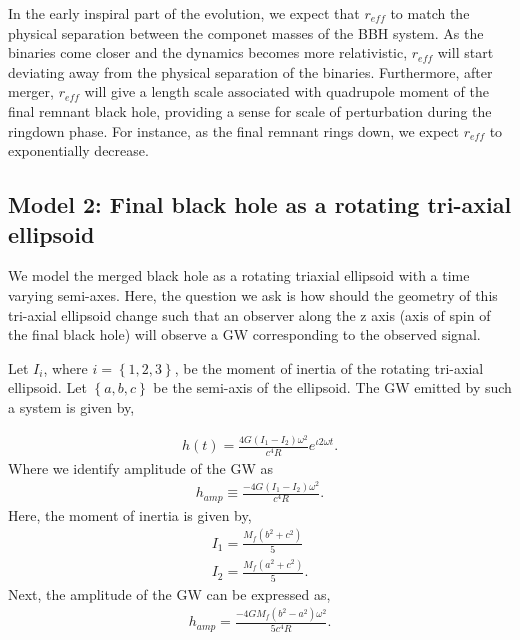In the early inspiral part of the evolution, we expect that $r_{eff}$ to match the physical separation between the componet masses of the BBH system. As the binaries come closer and the dynamics becomes more relativistic, $r_{eff}$ will start deviating away from the physical separation of the binaries. Furthermore, after merger, $r_{eff}$ will give a length scale associated with quadrupole moment of the final remnant black hole, providing a sense for scale of perturbation during the ringdown phase. For instance, as the final remnant rings down, we expect $r_{eff}$ to exponentially decrease. 

\subsection{Model 2: Final black hole as a rotating tri-axial ellipsoid} 
\label{sec:model2}
We model the merged black hole as a rotating triaxial ellipsoid with a time varying semi-axes. Here, the question we ask is how should the geometry of this tri-axial ellipsoid change such that an observer along the z axis (axis of spin of the final black hole) will observe a GW corresponding to the observed signal. 

Let $I_{i}$, where $i = \left\lbrace 1,2,3 \right\rbrace $, be the moment of inertia of the rotating tri-axial ellipsoid. Let $\left\lbrace a,b,c \right\rbrace$ be the semi-axis of the ellipsoid. The GW emitted by such a system is given by,

\begin{align}
h(t)=\frac{4 G (I_{1}-I_{2}) \omega^{2}}{c^4 R} e^{\iota 2\omega t}.
\end{align}
Where we identify amplitude of the GW as
\begin{align}
h_{amp}\equiv \frac{-4 G (I_{1}-I_{2}) \omega^{2}}{c^4 R}.
\end{align}
Here, the moment of inertia is given by, 
\begin{align}
I_{1}=\frac{M_{f} (b^{2}+c^{2})}{5}
\\I_{2}=\frac{M_{f} (a^{2}+c^{2})}{5}.
\end{align}
Next, the amplitude of the GW can be expressed as,
\begin{align}
\label{eq:hamp}
h_{amp}=\frac{-4 G M_{f} (b^{2}-a^{2}) \omega^{2}}{5 c^4 R}.
\end{align}

